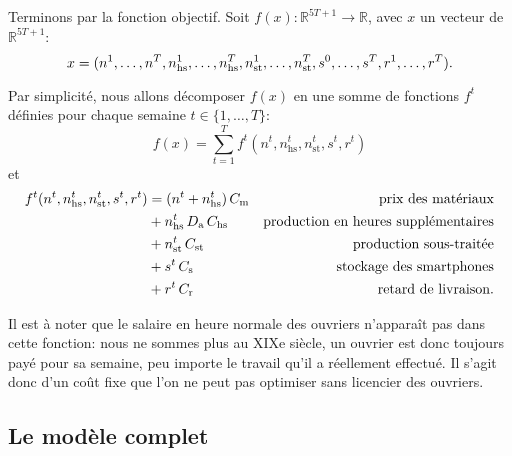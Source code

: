 Terminons par la fonction objectif. Soit
$f(x) : \mathbb{R}^{5T+1} \rightarrow \mathbb{R}$,
avec $x$ un vecteur de $\mathbb{R}^{5T+1}$:
\[
    x = (n^1,\dots,n^T,n_\mathrm{hs}^1,\dots,n_\mathrm{hs}^T,n_\mathrm{st}^1,\dots,n_\mathrm{st}^T,s^0,\dots,s^T,r^1,\dots,r^T)
    \text.
\]

Par simplicité, nous allons décomposer $f(x)$ en une somme de fonctions $f^t$ définies pour chaque semaine $t \in \{1,\dots,T\}$:
\[
    f(x) = \sum_{t=1}^{T} f^t(n^t, n_\mathrm{hs}^t, n_\mathrm{st}^t, s^t, r^t)
\]
et
\begin{align*}
    f^t(n^t, n_\mathrm{hs}^t, n_\mathrm{st}^t, s^t, r^t)
    &= (n^t + n_\mathrm{hs}^t)\,C_\mathrm{m} 
    & \text{prix des matériaux}\\
    &+ n_\mathrm{hs}^t\,D_\mathrm{a}\,C_\mathrm{hs}
    & \text{production en heures supplémentaires}\\
    &+ n_\mathrm{st}^t\,C_\mathrm{st}
    & \text{production sous-traitée}\\
    &+ s^t\,C_\mathrm{s}
    & \text{stockage des smartphones}\\
    &+ r^t\,C_\mathrm{r}
    & \text{retard de livraison}
    \text.
\end{align*}

Il est à noter que le salaire en heure normale des ouvriers n'apparaît pas dans cette fonction: nous ne sommes plus au XIXe siècle, un ouvrier est donc toujours payé pour sa semaine, peu importe le travail qu'il a réellement effectué. Il s'agit donc d'un coût fixe que l'on ne peut pas optimiser sans licencier des ouvriers.

\subsection*{Le modèle complet}

